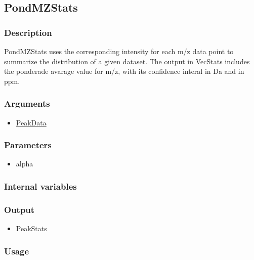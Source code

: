 \subsection{PondMZStats}\label{PondMZStats}
\subsubsection{Description}
PondMZStats uses the corresponding intensity for each m/z data point to summarize the distribution of a given dataset. The output in VecStats includes the ponderade avarage value for m/z, with its confidence interal in Da and in ppm.
\subsubsection{Arguments}
\begin{itemize}
\item \hyperref[PeakData]{PeakData}
\end{itemize}
\subsubsection{Parameters}
\begin{itemize}
\item alpha
\end{itemize}
\subsubsection{Internal variables}
\subsubsection{Output}
\begin{itemize}
\item PeakStats
\end{itemize}
\subsubsection{Usage}

